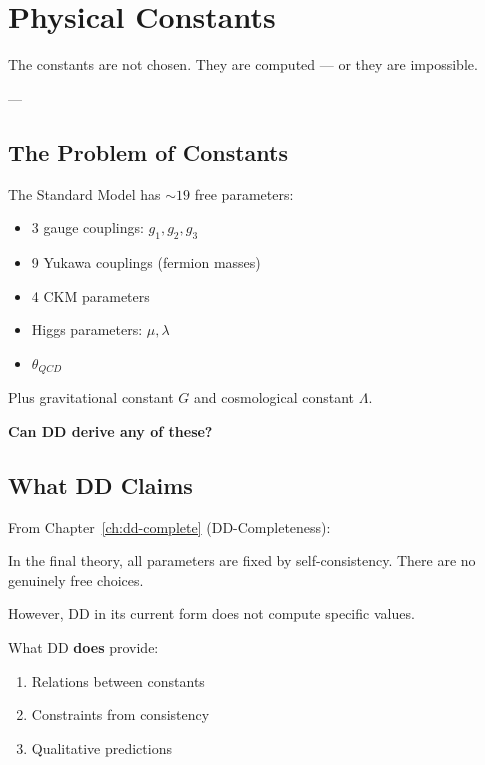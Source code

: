 
\chapter{Physical Constants}\label{ch:constants}

\epigraph{The constants are not chosen. They are computed — or they are impossible.}{---}


\section{The Problem of Constants}

The Standard Model has $\sim 19$ free parameters:
\begin{itemize}
    \item 3 gauge couplings: $g_1, g_2, g_3$
    \item 9 Yukawa couplings (fermion masses)
    \item 4 CKM parameters
    \item Higgs parameters: $\mu, \lambda$
    \item $\theta_{QCD}$
\end{itemize}

Plus gravitational constant $G$ and cosmological constant $\Lambda$.

\textbf{Can DD derive any of these?}

\section{What DD Claims}

From Chapter~\ref{ch:dd-complete} (DD-Completeness):

\begin{theorem}
In the final theory, all parameters are fixed by self-consistency. There are no genuinely free choices.
\end{theorem}

However, DD in its current form does not compute specific values.

What DD \textbf{does} provide:
\begin{enumerate}
    \item Relations between constants
    \item Constraints from consistency
    \item Qualitative predictions
\end{enumerate}

